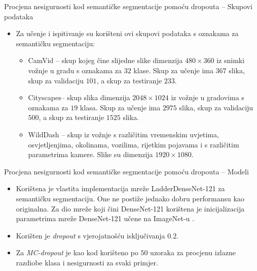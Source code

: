 \documentclass{beamer}
\begin{document}
\begin{frame}[allowframebreaks=0.9]{Procjena nesigurnosti kod semantičke segmentacije pomoću dropouta -- Skupovi podataka}
\begin{itemize}
	\item Za učenje i ispitivanje su korišteni ovi skupovi podataka s oznakama za semantičku segmentaciju:
	\begin{itemize}
		\item CamVid -- skup kojeg čine slijedne slike dimenzija $480\times360$ iz snimki vožnje u gradu s oznakama za $32$ klase. Skup za učenje ima $367$ slika, skup za validaciju $101$, a skup za testiranje $233$.
		\item Cityscapes-- skup slika dimenzija $2048\times1024$ iz vožnje u gradovima s oznakama za $19$ klasa. Skup za učenje ima $2975$ slika, skup za validaciju $500$, a skup za testiranje $1525$ slika.
		\item WildDash -- skup iz vožnje s različitim vremenskim uvjetima, osvjetljenjima, okolinama, vozilima, rijetkim pojavama i s različitim parametrima kamere. Slike su dimenzija $1920\times1080$.
	\end{itemize}
\end{itemize}
\end{frame}

\begin{frame}[allowframebreaks=0.9]{Procjena nesigurnosti kod semantičke segmentacije pomoću dropouta -- Modeli}
\begin{itemize}
	\item Korištena je vlastita implementacija mreže LadderDenseNet-121 \citep{Kreso:2017:LSDFSSLNI} za semantičku segmentaciju. One ne postiže jednako dobru performansu kao originalna. Za dio mreže koji čini DenseNet-121 korištena je inicijalizacija parametrima mreže DenseNet-121 učene na ImageNet-u \citep{Deng:2009:ILSHID}.
	\item Korišten je \textit{dropout} s vjerojatnošću isključivanja $0.2$.
	\item Za \textit{MC-dropout} je kao kod \citet{Kendall:2017:WUNBDLCV} korišteno po $50$ uzoraka za procjenu izlazne razdiobe klasa i nesigurnosti za svaki primjer.	
\end{itemize}
\end{frame}
\end{document}
